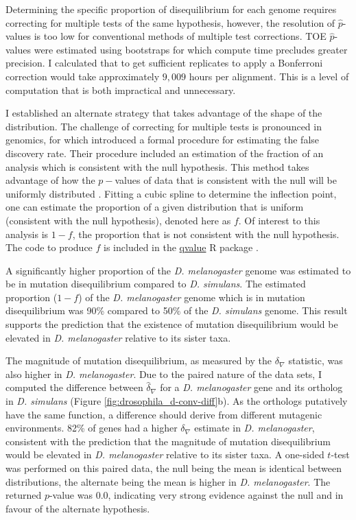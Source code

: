 

Determining the specific proportion of disequilibrium for each genome requires correcting for multiple tests of the same hypothesis, however, the resolution of $\hat p$-values is too low for conventional methods of multiple test corrections. TOE $\hat p$-values were estimated using bootstraps for which compute time precludes greater precision. I calculated that to get sufficient replicates to apply a Bonferroni correction would take approximately $9,009$ hours per alignment. This is a level of computation that is both impractical and unnecessary. 

I established an alternate strategy that takes advantage of the shape of the distribution. The challenge of correcting for multiple tests is pronounced in genomics, for which \cite{Storey2003StatisticalStudies} introduced a formal procedure for estimating the false discovery rate. Their procedure included an estimation of the fraction of an analysis which is consistent with the null hypothesis. This method takes advantage of how the $p-$values of data that is consistent with the null will be uniformly distributed \citep[see Figure 1][]{Storey2003StatisticalStudies}. Fitting a cubic spline to determine the inflection point, one can estimate the proportion of a given distribution that is uniform (consistent with the null hypothesis), denoted here as $f$. Of interest to this analysis is $1 - f$, the proportion that is not consistent with the null hypothesis. The code to produce $f$ is included in the \href{https://github.com/StoreyLab/qvalue}{qvalue} R package \citep{Storey2004StrongApproach}.

A significantly higher proportion of the \textit{D. melanogaster} genome was estimated to be in mutation disequilibrium compared to \textit{D. simulans}. The estimated proportion ($1 - f$) of the \textit{D. melanogaster} genome which is in mutation disequilibrium was 90\% compared to 50\% of the \textit{D. simulans} genome. This result supports the prediction that the existence of mutation disequilibrium would be elevated in \textit{D. melanogaster} relative to its sister taxa.

The magnitude of mutation disequilibrium, as measured by the $\delta_\nabla$  statistic, was also higher in \textit{D. melanogaster}. Due to the paired nature of the data sets, I computed the difference between $\hat \delta_\nabla$ for a \textit{D. melanogaster} gene and its ortholog in \textit{D. simulans} (Figure \ref{fig:drosophila_d-conv-diff}b). As the orthologs putatively have the same function, a difference should derive from different mutagenic environments. 82\% of genes had a higher $\delta_\nabla$ estimate in \textit{D. melanogaster}, consistent with the prediction that the magnitude of mutation disequilibrium would be elevated in \textit{D. melanogaster} relative to its sister taxa. A one-sided $t$-test was performed on this paired data, the null being the mean is identical between distributions, the alternate being the mean is higher in \textit{D. melanogaster}. The returned $p$-value was 0.0, indicating very strong evidence against the null and in favour of the alternate hypothesis. 

